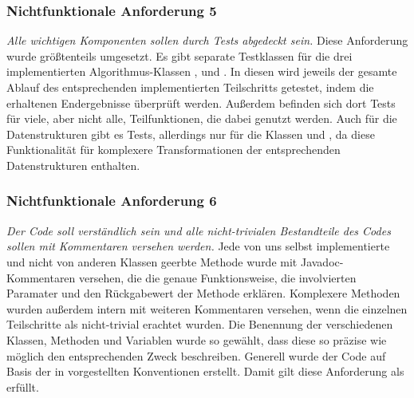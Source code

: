 \subsubsection{Nichtfunktionale Anforderung 5}
\textit{Alle wichtigen Komponenten sollen durch Tests abgedeckt sein.} Diese Anforderung wurde größtenteils umgesetzt. Es gibt separate Testklassen für
die drei implementierten Algorithmus-Klassen ,  und . In diesen wird jeweils der gesamte Ablauf
des entsprechenden implementierten Teilschritts getestet, indem die erhaltenen Endergebnisse überprüft werden. Außerdem befinden sich dort Tests für
viele, aber nicht alle, Teilfunktionen, die dabei genutzt werden. Auch für die Datenstrukturen gibt es Tests, allerdings nur für die Klassen 
und , da diese Funktionalität für komplexere Transformationen der entsprechenden Datenstrukturen enthalten.

\subsubsection{Nichtfunktionale Anforderung 6}
\textit{Der Code soll verständlich sein und alle nicht-trivialen Bestandteile des Codes sollen mit Kommentaren versehen werden.} Jede von uns selbst
implementierte und nicht von anderen Klassen geerbte Methode wurde mit Javadoc-Kommentaren versehen, die die genaue Funktionsweise, die involvierten
Paramater und den Rückgabewert der Methode erklären. Komplexere Methoden wurden außerdem intern mit weiteren Kommentaren versehen, wenn die einzelnen
Teilschritte als nicht-trivial erachtet wurden. Die Benennung der verschiedenen Klassen, Methoden und Variablen wurde so gewählt, dass diese so präzise
wie möglich den entsprechenden Zweck beschreiben. Generell wurde der Code auf Basis der in \cite{49_java_conventions} vorgestellten Konventionen erstellt.
Damit gilt diese Anforderung als erfüllt.
